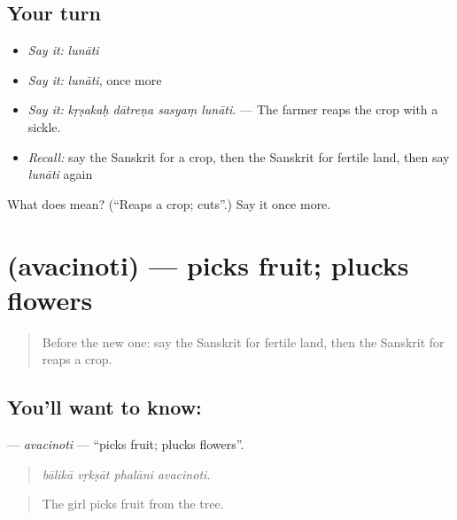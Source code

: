 \subsection*{Your turn}
\begin{itemize}
\raggedright
  \item \emph{Say it:} \emph{lunāti}
  \item \emph{Say it:} \emph{lunāti}, once more
  \item \emph{Say it:} \emph{kṛṣakaḥ dātreṇa sasyaṃ lunāti.} — The farmer reaps the crop with a sickle.
  \item \emph{Recall:} say the Sanskrit for a crop, then the Sanskrit for fertile land, then say \emph{lunāti} again
\end{itemize}

\begin{tcolorbox}[breakable,colback=teal!4,colframe=teal!35!black,title={Before you move on}]
What does  mean? (\textquotedblleft{}Reaps a crop; cuts\textquotedblright{}.) Say it once more.
\end{tcolorbox}
\section[\texorpdfstring{\sk{अवचिनोति} (avacinoti)}{अवचिनोति (avacinoti)}]{ (avacinoti) — picks fruit; plucks flowers}

\label{lesson:SA-C447-avacinoti}



\begin{quote}
Before the new one: say the Sanskrit for fertile land, then the Sanskrit for reaps a crop.
\end{quote}

\subsection*{You'll want to know: }
\textbf{} — \emph{avacinoti} — \textquotedblleft{}picks fruit; plucks flowers\textquotedblright{}.

\begin{quote}
   
\end{quote}

\begin{quote}
\emph{bālikā vṛkṣāt phalāni avacinoti.}
\end{quote}

\begin{quote}
The girl picks fruit from the tree.
\end{quote}

